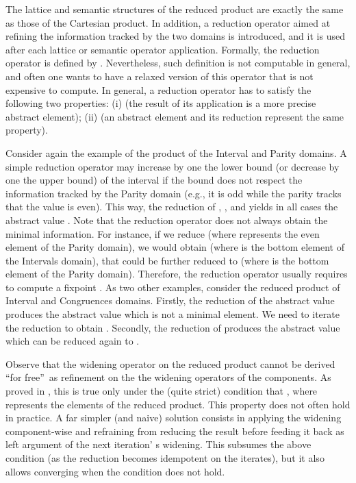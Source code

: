 \documentclass[submission,copyright,creativecommons]{eptcs}
\begin{document}
The lattice and semantic structures of the reduced product are exactly the same as those of the Cartesian product. In addition, a reduction operator aimed at refining the information tracked by the two domains is introduced, and it is used after each lattice or semantic operator application. Formally, the reduction operator  is defined by . Nevertheless, such definition is not computable in general, and often one wants to have a relaxed version of this operator that is not expensive to compute. In general, a reduction operator has to satisfy the following two properties: (i)  (the result of its application is a more precise abstract element); (ii)  (an abstract element and its reduction represent the same property).

Consider again the example of the product of the Interval and Parity domains. A simple reduction operator may increase by one the lower bound (or decrease by one the upper bound) of the interval if the bound does not respect the information tracked by the Parity domain (e.g., it is odd while the parity tracks that the value is even). This way, the reduction of , , and  yields in all cases the abstract value . Note that the reduction operator does not always obtain the minimal information. For instance, if we reduce  (where  represents the even element of the Parity domain), we would obtain  (where  is the bottom element of the Intervals domain), that could be further reduced to  (where  is the bottom element of the Parity domain). Therefore, the reduction operator usually requires to compute a fixpoint \cite{MIT}. 
As two other examples, consider the reduced product of Interval and Congruences domains. Firstly, the reduction of the abstract value  produces the abstract value  which is not a minimal element. We need to iterate the reduction to obtain . Secondly, the reduction of  produces the abstract value  which can be reduced again to .

Observe that the widening operator on the reduced product cannot be derived \textquotedblleft for free\textquotedblright\ as refinement on the the widening operators of the components. As proved in \cite{ZanioliCortesi}, this is true only under the (quite strict) condition that , where  represents the elements of the reduced product.
This property does not often hold in practice. A far simpler (and naive) solution consists in applying the widening component-wise and refraining from reducing the result before feeding it back as left argument of the next iteration' s widening. This subsumes the above condition (as the reduction becomes idempotent on the iterates), but it also allows converging when the condition does not hold.
\end{document}
